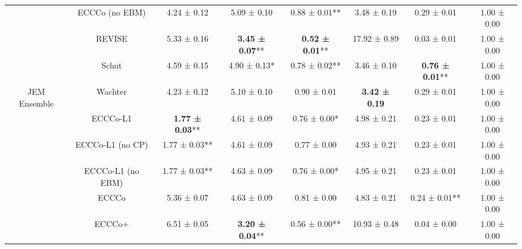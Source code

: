 \begin{table}
{\begin{tabular}[t]{cccccccc}
 & ECCCo (no EBM) & 4.24 ± 0.12\hphantom{*}\hphantom{*} & 5.09 ± 0.10\hphantom{*}\hphantom{*} & 0.88 ± 0.01** & 3.48 ± 0.19\hphantom{*}\hphantom{*} & 0.29 ± 0.01\hphantom{*}\hphantom{*} & 1.00 ± 0.00\hphantom{*}\hphantom{*}\\

 & REVISE & 5.33 ± 0.16\hphantom{*}\hphantom{*} & \textbf{3.45 ± 0.07}** & \textbf{0.52 ± 0.01}** & 17.92 ± 0.89\hphantom{*}\hphantom{*} & 0.03 ± 0.01\hphantom{*}\hphantom{*} & 1.00 ± 0.00\hphantom{*}\hphantom{*}\\

 & Schut & 4.59 ± 0.15\hphantom{*}\hphantom{*} & 4.90 ± 0.13*\hphantom{*} & 0.78 ± 0.02** & 3.46 ± 0.10\hphantom{*}\hphantom{*} & \textbf{0.76 ± 0.01}** & 1.00 ± 0.00\hphantom{*}\hphantom{*}\\

\multirow[t]{-10}{*}{\centering\arraybackslash JEM Ensemble} & Wachter & 4.23 ± 0.12\hphantom{*}\hphantom{*} & 5.10 ± 0.10\hphantom{*}\hphantom{*} & 0.90 ± 0.01\hphantom{*}\hphantom{*} & \textbf{3.42 ± 0.19}\hphantom{*}\hphantom{*} & 0.29 ± 0.01\hphantom{*}\hphantom{*} & 1.00 ± 0.00\hphantom{*}\hphantom{*}\\
\cmidrule{1-8}
 & ECCCo-L1 & \textbf{1.77 ± 0.03}** & 4.61 ± 0.09\hphantom{*}\hphantom{*} & 0.76 ± 0.00*\hphantom{*} & 4.98 ± 0.21\hphantom{*}\hphantom{*} & 0.23 ± 0.01\hphantom{*}\hphantom{*} & 1.00 ± 0.00\hphantom{*}\hphantom{*}\\

 & ECCCo-L1 (no CP) & 1.77 ± 0.03** & 4.61 ± 0.09\hphantom{*}\hphantom{*} & 0.77 ± 0.00\hphantom{*}\hphantom{*} & 4.93 ± 0.21\hphantom{*}\hphantom{*} & 0.23 ± 0.01\hphantom{*}\hphantom{*} & 1.00 ± 0.00\hphantom{*}\hphantom{*}\\

 & ECCCo-L1 (no EBM) & 1.77 ± 0.03** & 4.63 ± 0.09\hphantom{*}\hphantom{*} & 0.76 ± 0.00*\hphantom{*} & 4.95 ± 0.21\hphantom{*}\hphantom{*} & 0.23 ± 0.01\hphantom{*}\hphantom{*} & 1.00 ± 0.00\hphantom{*}\hphantom{*}\\

 & ECCCo & 5.36 ± 0.07\hphantom{*}\hphantom{*} & 4.63 ± 0.09\hphantom{*}\hphantom{*} & 0.81 ± 0.00\hphantom{*}\hphantom{*} & 4.83 ± 0.21\hphantom{*}\hphantom{*} & 0.24 ± 0.01** & 1.00 ± 0.00\hphantom{*}\hphantom{*}\\

 & ECCCo+ & 6.51 ± 0.05\hphantom{*}\hphantom{*} & \textbf{3.20 ± 0.04}** & 0.56 ± 0.00** & 10.93 ± 0.48\hphantom{*}\hphantom{*} & 0.04 ± 0.00\hphantom{*}\hphantom{*} & 1.00 ± 0.00\hphantom{*}\hphantom{*}\\


\end{tabular}}
\end{table}
